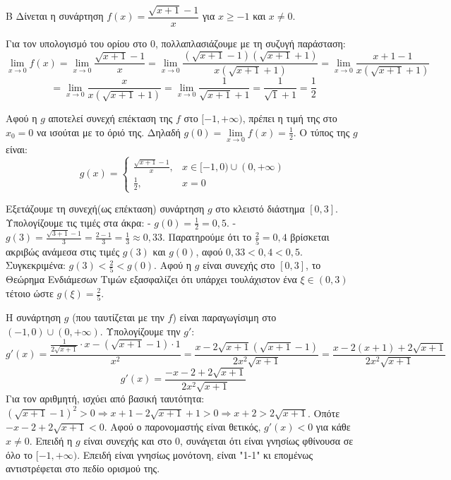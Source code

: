 
\begin{thema}{Β}
Δίνεται η συνάρτηση $f(x) = \dfrac{\sqrt{x+1}-1}{x}$ για $x \ge -1$ και $x \ne 0$.
\begin{erwthma}
\item Για τον υπολογισμό του ορίου στο 0, πολλαπλασιάζουμε με τη συζυγή παράσταση:
\[ \lim_{x\to0} f(x) = \lim_{x\to0} \frac{\sqrt{x+1}-1}{x} = \lim_{x\to0} \frac{(\sqrt{x+1}-1)(\sqrt{x+1}+1)}{x(\sqrt{x+1}+1)} = \lim_{x\to0} \frac{x+1-1}{x(\sqrt{x+1}+1)} \]
\[ = \lim_{x\to0} \frac{x}{x(\sqrt{x+1}+1)} = \lim_{x\to0} \frac{1}{\sqrt{x+1}+1} = \frac{1}{\sqrt{1}+1} = \frac{1}{2} \]

\item Αφού η $g$ αποτελεί συνεχή επέκταση της $f$ στο $[-1, +\infty)$, πρέπει η τιμή της στο $x_0 = 0$ να ισούται με το όριό της. Δηλαδή $g(0) = \lim\limits_{x\to0} f(x) = \frac{1}{2}$.
Ο τύπος της $g$ είναι:
\[ g(x) = \begin{cases} \frac{\sqrt{x+1}-1}{x}, & x \in [-1, 0) \cup (0, +\infty) \\ \frac{1}{2}, & x = 0 \end{cases} \]

\item Εξετάζουμε τη συνεχή(ως επέκταση) συνάρτηση $g$ στο κλειστό διάστημα $[0, 3]$.
Υπολογίζουμε τις τιμές στα άκρα:
- $g(0) = \frac{1}{2} = 0,5$.
- $g(3) = \frac{\sqrt{3+1}-1}{3} = \frac{2-1}{3} = \frac{1}{3} \approx 0,33$.
Παρατηρούμε ότι το $\frac{2}{5} = 0,4$ βρίσκεται ακριβώς ανάμεσα στις τιμές $g(3)$ και $g(0)$, αφού $0,33 < 0,4 < 0,5$. 
Συγκεκριμένα: $g(3) < \frac{2}{5} < g(0)$.
Αφού η $g$ είναι συνεχής στο $[0, 3]$, το Θεώρημα Ενδιάμεσων Τιμών εξασφαλίζει ότι υπάρχει τουλάχιστον ένα $\xi \in (0, 3)$ τέτοιο ώστε $g(\xi) = \frac{2}{5}$.

\item Η συνάρτηση $g$ (που ταυτίζεται με την $f$) είναι παραγωγίσιμη στο $(-1, 0) \cup (0, +\infty)$. Υπολογίζουμε την $g'$:
\[ g'(x) = \frac{ \frac{1}{2\sqrt{x+1}}\cdot x - (\sqrt{x+1}-1)\cdot 1 }{x^2} = \frac{ x - 2\sqrt{x+1}(\sqrt{x+1}-1) }{2x^2\sqrt{x+1}} = \frac{ x - 2(x+1) + 2\sqrt{x+1} }{2x^2\sqrt{x+1}} \]
\[ g'(x) = \frac{ -x - 2 + 2\sqrt{x+1} }{2x^2\sqrt{x+1}} \]
Για τον αριθμητή, ισχύει από βασική ταυτότητα: $(\sqrt{x+1}-1)^2 > 0 \Rightarrow x+1 - 2\sqrt{x+1} + 1 > 0 \Rightarrow x+2 > 2\sqrt{x+1}$.
Οπότε $-x-2+2\sqrt{x+1} < 0$. Αφού ο παρονομαστής είναι θετικός, $g'(x) < 0$ για κάθε $x \neq 0$.
Επειδή η $g$ είναι συνεχής και στο 0, συνάγεται ότι είναι γνησίως φθίνουσα σε όλο το $[-1, +\infty)$. Επειδή είναι γνησίως μονότονη, είναι "1-1" κι επομένως αντιστρέφεται στο πεδίο ορισμού της.
\end{erwthma}
\end{thema}

